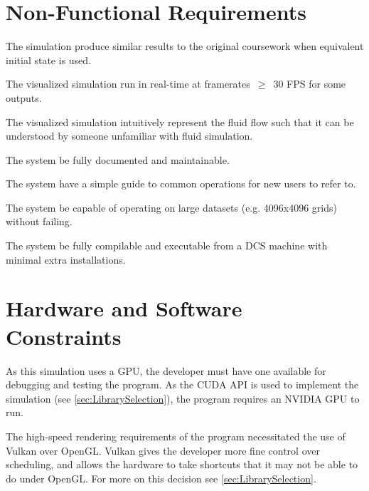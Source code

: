 \section{Non-Functional Requirements}
\begin{reqNF}
    \item \label{reqN:SimilarOutput} The simulation \must{} produce similar results to the original coursework when equivalent initial state is used.
    \item \label{reqN:Realtime} The visualized simulation \must{} run in real-time at framerates~$\ge$~30 FPS for some outputs.
    \item \label{reqN:Intuitive} The visualized simulation \should{} intuitively represent the fluid flow such that it can be understood by someone unfamiliar with fluid simulation.
    \item \label{reqN:Documented} The system \must{} be fully documented and maintainable. %
    \item \label{reqN:UsageGuide} The system \should{} have a simple guide to common operations for new users to refer to.
    \item \label{reqN:LargeData} The system \must{} be capable of operating on large datasets (e.g. 4096x4096 grids) without failing.
    \item \label{reqN:DCSCompile} The system \should{} be fully compilable and executable from a DCS machine with minimal extra installations.
\end{reqNF}


\section{Hardware and Software Constraints}
\label{sec:Requirements_HardwareSoftware}
As this simulation uses a GPU, the developer must have one available for debugging and testing the program.
As the CUDA API is used to implement the simulation (see \cref{sec:LibrarySelection}), the program requires an NVIDIA GPU to run.

The high-speed rendering requirements of the program necessitated the use of Vulkan over OpenGL.
Vulkan gives the developer more fine control over scheduling, and allows the hardware to take shortcuts that it may not be able to do under OpenGL.
For more on this decision see \cref{sec:LibrarySelection}.